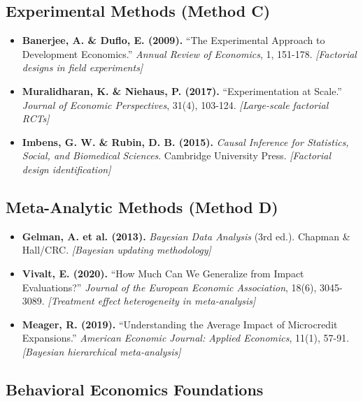 \documentclass[11pt,a4paper]{article}
\theoremstyle{definition}
\begin{document}
\subsection{Experimental Methods (Method C)}

\begin{itemize}

\item \textbf{Banerjee, A. \& Duflo, E. (2009).} 
``The Experimental Approach to Development Economics.'' 
\textit{Annual Review of Economics}, 1, 151-178.
\textit{[Factorial designs in field experiments]}

\item \textbf{Muralidharan, K. \& Niehaus, P. (2017).} 
``Experimentation at Scale.'' 
\textit{Journal of Economic Perspectives}, 31(4), 103-124.
\textit{[Large-scale factorial RCTs]}

\item \textbf{Imbens, G. W. \& Rubin, D. B. (2015).} 
\textit{Causal Inference for Statistics, Social, and Biomedical Sciences}. 
Cambridge University Press.
\textit{[Factorial design identification]}

\end{itemize}

\subsection{Meta-Analytic Methods (Method D)}

\begin{itemize}

\item \textbf{Gelman, A. et al. (2013).} 
\textit{Bayesian Data Analysis} (3rd ed.). 
Chapman \& Hall/CRC.
\textit{[Bayesian updating methodology]}

\item \textbf{Vivalt, E. (2020).} 
``How Much Can We Generalize from Impact Evaluations?'' 
\textit{Journal of the European Economic Association}, 18(6), 3045-3089.
\textit{[Treatment effect heterogeneity in meta-analysis]}

\item \textbf{Meager, R. (2019).} 
``Understanding the Average Impact of Microcredit Expansions.'' 
\textit{American Economic Journal: Applied Economics}, 11(1), 57-91.
\textit{[Bayesian hierarchical meta-analysis]}

\end{itemize}

\subsection{Behavioral Economics Foundations}
\end{document}
